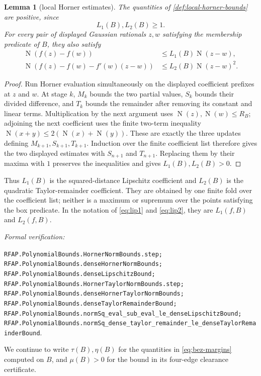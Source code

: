 \documentclass[11pt]{article}
\newtheorem{lemma}[theorem]{Lemma}
\newcommand{\Norm}[1]{\operatorname{N}\!\left(#1\right)}
\newcommand{\leanref}[1]{\par\smallskip\noindent
  \emph{Formal verification:}\par\nobreak
  {\raggedright\nolinkurl{#1}.\par}}
\begin{document}
\begin{lemma}[local Horner estimates]
\label{lem:local-horner-estimates}
The quantities of \cref{def:local-horner-bounds} are positive, since
\[
                         L_1(B),L_2(B)\ge1.
\]
For every pair of displayed Gaussian rationals $z,w$ satisfying the
membership predicate of $B$, they also satisfy
\begin{align}
 \Norm{f(z)-f(w)}
   &\le L_1(B)\Norm{z-w},
   \label{eq:local-l1}\\
 \Norm{f(z)-f(w)-f'(w)(z-w)}
   &\le L_2(B)\Norm{z-w}^2.
   \label{eq:local-l2}
\end{align}
\end{lemma}

\begin{proof}
Run Horner evaluation simultaneously on the displayed coefficient prefixes
at $z$ and $w$.  At stage $k$, $M_k$ bounds the two partial values, $S_k$
bounds their divided difference, and $T_k$ bounds the remainder after
removing its constant and linear terms.  Multiplication by the next argument
uses $\Norm z,\Norm w\le R_B$; adjoining the next coefficient uses the finite
two-term inequality $\Norm{x+y}\le2(\Norm x+\Norm y)$.  These are exactly the
three updates defining $M_{k+1},S_{k+1},T_{k+1}$.  Induction over the finite
coefficient list therefore gives the two displayed estimates with
$S_{n+1}$ and $T_{n+1}$.  Replacing them by their maxima with $1$ preserves
the inequalities and gives $L_1(B),L_2(B)>0$.
\end{proof}

Thus $L_1(B)$ is the squared-distance Lipschitz coefficient and $L_2(B)$
is the quadratic Taylor-remainder coefficient.  They are obtained by one
finite fold over the coefficient list; neither is a maximum or supremum over
the points satisfying the box predicate.  In the notation of
\eqref{eq:lip1} and \eqref{eq:lip2}, they are $L_1(f,B)$ and $L_2(f,B)$.

\leanref{RFAP.PolynomialBounds.HornerNormBounds.step;
RFAP.PolynomialBounds.denseHornerNormBounds;
RFAP.PolynomialBounds.denseLipschitzBound;
RFAP.PolynomialBounds.HornerTaylorNormBounds.step;
RFAP.PolynomialBounds.denseHornerTaylorNormBounds;
RFAP.PolynomialBounds.denseTaylorRemainderBound;
RFAP.PolynomialBounds.normSq_eval_sub_eval_le_denseLipschitzBound;
RFAP.PolynomialBounds.normSq_dense_taylor_remainder_le_denseTaylorRemainderBound}

We continue to write $\tau(B),\eta(B)$ for the quantities in
\eqref{eq:bez-margins} computed on $B$, and $\mu(B)>0$ for the bound in its
four-edge clearance certificate.
\end{document}
